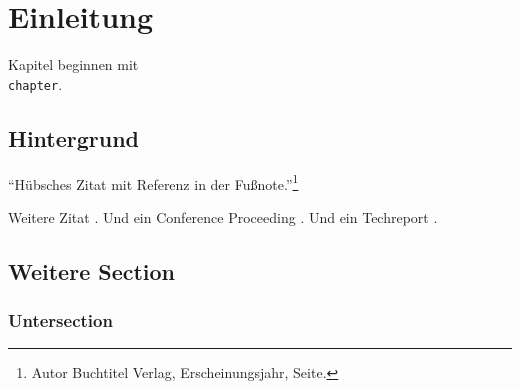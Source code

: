 
\chapter{Einleitung}
\label{chap:einleitung}

Kapitel beginnen mit \texttt{\\chapter}.

\section{Hintergrund} %
\label{sec:hintergrund}

\begin{center}
    ``Hübsches Zitat mit Referenz in der Fußnote.''\footnote{Autor Buchtitel Verlag, Erscheinungsjahr, Seite.}
\end{center}

Weitere Zitat \cite{weise2014benchmarking}. Und ein Conference Proceeding \cite{Hess2017}. Und ein Techreport \cite{instance1290}.

\section{Weitere Section} %
\label{sec:weitere_arbeiten}

\subsection{Untersection}
\label{ssec:untersection}

\blindtext
